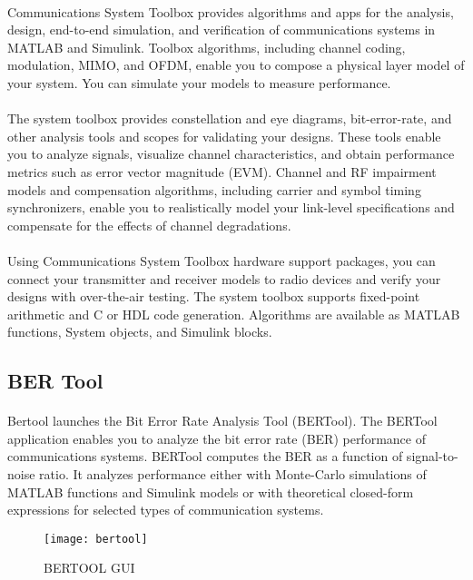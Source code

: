 \documentclass[14pt]{report}
\begin{document}
{\paragraph{} Communications System Toolbox provides algorithms and apps for the analysis, design, end-to-end simulation, and verification of communications systems in MATLAB and Simulink. Toolbox algorithms, including channel coding, modulation, MIMO, and OFDM, enable you to compose a physical layer model of your system. You can simulate your models to measure performance.
\paragraph{} The system toolbox provides constellation and eye diagrams, bit-error-rate, and other analysis tools and scopes for validating your designs. These tools enable you to analyze signals, visualize channel characteristics, and obtain performance metrics such as error vector magnitude (EVM). Channel and RF impairment models and compensation algorithms, including carrier and symbol timing synchronizers, enable you to realistically model your link-level specifications and compensate for the effects of channel degradations.
\paragraph{} Using Communications System Toolbox hardware support packages, you can connect your transmitter and receiver models to radio devices and verify your designs with over-the-air testing. The system toolbox supports fixed-point arithmetic and C or HDL code generation.
Algorithms are available as MATLAB functions, System objects, and Simulink blocks.
\subsection{BER Tool}
\paragraph{} Bertool launches the Bit Error Rate Analysis Tool (BERTool). The BERTool application enables you to analyze the bit error rate (BER) performance of communications systems. BERTool computes the BER as a function of signal-to-noise ratio. It analyzes performance either with Monte-Carlo simulations of MATLAB functions and Simulink models or with theoretical closed-form expressions for selected types of communication systems.
\begin{figure}[ht]
\centering
\texttt{[image: bertool]}
\caption{BERTOOL GUI}
\end{figure}
}
\end{document}
